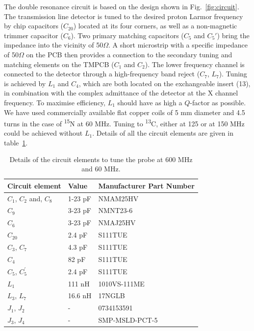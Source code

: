 \documentclass[preprint,5p]{elsarticle}
\newcommand{\fig}[1]{Fig.~\ref{#1}}
\begin{document}
\cbstart The double resonance circuit is based on the design shown in \fig{fig:circuit}.\cbend
 The transmission line detector is tuned to the desired proton
Larmor frequency by chip capacitors ($C_{20}$) located at its four corners,
as well as a non-magnetic trimmer capacitor ($C_6$). Two primary
matching capacitors ($C_5$ and $C_5'$) bring the impedance into the
vicinity of 50$\Omega$. A short microstrip
with a specific impedance of 50$\Omega$
on the PCB then provides a connection to the secondary tuning and matching elements on the TMPCB ($C_1$ and $C_2$).
The lower frequency channel is connected to the detector through a high-frequency band reject ($C_7$, $L_7$).
Tuning is achieved by $L_1$ and $C_4$, which are both located on the exchangeable insert (13), in combination with
the complex admittance of the detector at the X channel frequency.
To maximise efficiency, $L_1$ should have as high a $Q$-factor as possible. We have
used commercially available flat copper coils of 5 mm diameter and 4.5 turns in the case of
\textsuperscript{15}N at 60 MHz. Tuning to \textsuperscript{13}C, either at 125 or at 150 MHz
could be achieved without $L_1$. \cbstart Details of all the circuit elements are given in table~\ref{tab:circuit}.
\begin{table}[h]
\centering
\caption{Details of the circuit elements to tune the probe at 600 MHz and 60 MHz.}
\label{tab:circuit}
\begin{tabular}{||p{.3\linewidth}|p{.2\linewidth}|p{.3\linewidth}||}
\hline
Circuit element   & Value	&Manufacturer Part Number	\\
\hline
$C_1$, $C_2$ and, $C_8$		&1-23 pF	& NMAM25HV\\
$C_9$	&3-23 pF	& NMNT23-6\\
$C_6$	&3-23 pF	& NMAJ25HV\\
$C_{20}$  & 2.4 pF		& S111TUE\\
$C_3$, $C_7$	&4.3 pF		& S111TUE\\
$C_4$	&82 pF	& S111TUE\\
$C_5$, $C^{'}_{5}$	&2.4 pF	& S111TUE\\
$L_1$	&111 nH	& 1010VS-111ME\\
$L_3$, $L_7$	 &16.6 nH	& 17NGLB\\
$J_1$, $J_2$ & -&0734153591\\
$J_3$, $J_4$ & -&SMP-MSLD-PCT-5\\
\hline
\end{tabular}
\end{table}
\end{document}
